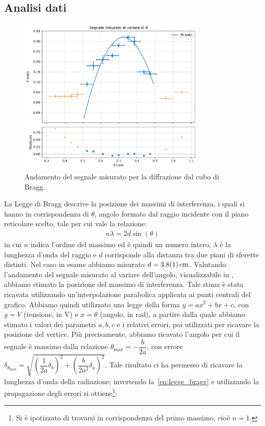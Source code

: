 \documentclass[a4paper]{article}
\begin{document}
\subsection{Analisi dati}
\begin{figure}[htbp]
	\centering
	\includegraphics[width=0.8\textwidth]{grafici/bragg.pdf}
	\caption{Andamento del segnale misurato per la diffrazione dal cubo di Bragg.}
	\label{fig:grafico_bragg}
\end{figure}
La Legge di Bragg descrive la posizione dei massimi di interferenza, i quali si hanno in corrispondenza di $\theta$, angolo formato dal raggio incidente con il piano reticolare scelto, tale per cui vale la relazione:
\begin{align}
    n\lambda=2d \sin(\theta)
    \label{eq:legge_bragg} 
\end{align}
in cui $n$ indica l'ordine del massimo ed è quindi un numero intero, $\lambda$ è la lunghezza d'onda del raggio e $d$ corrisponde alla distanza tra due piani di sferette distinti. Nel caso in esame abbiamo misurato $d = \SI{3.8 \pm 0.1}{\centi\metre}$.
Valutando l'andamento del segnale misurato al variare dell'angolo, visualizzabile in , abbiamo stimato la posizione del massimo di interferenza. Tale stima è stata ricavata utilizzando un'interpolazione parabolica applicata ai punti centrali del grafico. Abbiamo quindi utilizzato una legge della forma $y = ax^2 + bx +c$, con $y=V$ (tensione, in \si{\volt}) e $x=\theta$ (angolo, in \si{\radian}), a partire dalla quale abbiamo stimato i valori dei parametri $a, b, c$ e i relativi errori, poi utilizzati per ricavare la posizione del vertice. Più precisamente, abbiamo ricavato l'angolo per cui il segnale è massimo dalla relazione $\theta_{\text{max}} = -\dfrac{b}{2a}$, con errore $\delta_{\theta_{\text{max}}} = \sqrt{\left(\dfrac{1}{2a}\delta_b\right)^2 + \left(\dfrac{b}{2a^2}\delta_a\right)^2}$. Tale risultato ci ha permesso di ricavare la lunghezza d'onda della radiazione; invertendo la~\cref{eq:legge_bragg} e utilizzando la propagazione degli errori si ottiene\footnote{Si è ipotizzato di trovarsi in corrispondenza del primo massimo, cioè $n=1$.}:
\end{document}
